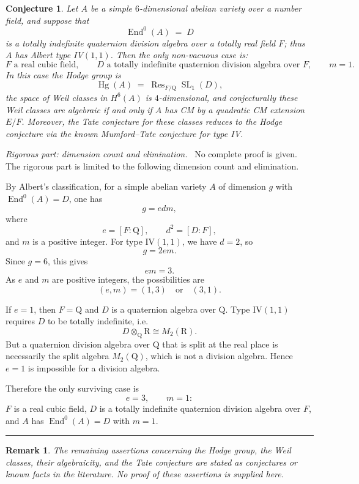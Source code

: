 \documentclass{article}
\DeclareMathOperator{\Res}{Res}
\DeclareMathOperator{\Hg}{Hg}
\DeclareMathOperator{\SL}{SL}
\DeclareMathOperator{\End}{End}
\newcommand{\Q}{\mathrm{Q}}
\newcommand{\R}{\mathrm{R}}
\newtheorem{conjecture}{Conjecture}
\newtheorem{remark}{Remark}
\newenvironment{proof}[1][Proof]{\par\noindent\textit{#1.}\ }{\hfill\rule{1.2ex}{1.2ex}\par}
\begin{document}
\begin{conjecture}
Let $A$ be a simple $6$-dimensional abelian variety over a number field, and suppose that
\[
\End^0(A) \;=\; D
\]
is a totally indefinite quaternion division algebra over a totally real field $F$; thus $A$ has Albert type IV$(1,1)$. Then the only non-vacuous case is:
\[
F \text{ a real cubic field},\qquad D \text{ a totally indefinite quaternion division algebra over } F,\qquad m=1.
\]
In this case the Hodge group is
\[
\Hg(A) \;=\; \Res_{F/\Q}\SL_1(D),
\]
the space of Weil classes in $H^6(A)$ is $4$-dimensional, and conjecturally these Weil classes are algebraic if and only if $A$ has CM by a quadratic CM extension $E/F$. Moreover, the Tate conjecture for these classes reduces to the Hodge conjecture via the known Mumford--Tate conjecture for type IV.
\end{conjecture}

\begin{proof}[Rigorous part: dimension count and elimination]
No complete proof is given. The rigorous part is limited to the following dimension count and elimination.

By Albert's classification, for a simple abelian variety $A$ of dimension $g$ with $\End^0(A)=D$, one has
\[
g = e d m,
\]
where
\[
e=[F:\Q],\qquad d^2=[D:F],
\]
and $m$ is a positive integer. For type IV$(1,1)$, we have $d=2$, so
\[
g = 2 e m.
\]
Since $g=6$, this gives
\[
e m = 3.
\]
As $e$ and $m$ are positive integers, the possibilities are
\[
(e,m)=(1,3)\quad\text{or}\quad (3,1).
\]

If $e=1$, then $F=\Q$ and $D$ is a quaternion algebra over $\Q$. Type IV$(1,1)$ requires $D$ to be totally indefinite, i.e.
\[
D\otimes_\Q \R \cong M_2(\R).
\]
But a quaternion division algebra over $\Q$ that is split at the real place is necessarily the split algebra $M_2(\Q)$, which is not a division algebra. Hence $e=1$ is impossible for a division algebra.

Therefore the only surviving case is
\[
e=3,\qquad m=1:
\]
$F$ is a real cubic field, $D$ is a totally indefinite quaternion division algebra over $F$, and $A$ has $\End^0(A)=D$ with $m=1$.
\end{proof}

\begin{remark}
The remaining assertions concerning the Hodge group, the Weil classes, their algebraicity, and the Tate conjecture are stated as conjectures or known facts in the literature. No proof of these assertions is supplied here.
\end{remark}
\end{document}
